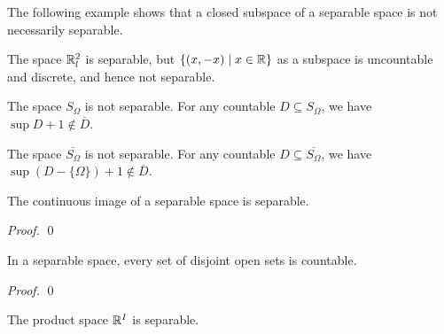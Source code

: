 The following example shows that a closed subspace of a separable space is not
necessarily separable.
\begin{example}[AC]
    The space $\mathbb{R}_l^2$ is separable, but $\{ (x, -x) \mid x \in \mathbb{R} \}$ as a
    subspace is uncountable and discrete, and hence not separable.
\end{example}

\begin{example}
    The space $S_\Omega$ is not separable. For any countable $D \subseteq S_\Omega$,
    we have $\sup D + 1 \notin \overline{D}$.
\end{example}

\begin{example}    
    The space $\overline{S_\Omega}$ is not separable. For any countable $D
    \subseteq \overline{S_\Omega}$, we have $\sup (D - \{ \Omega \}) + 1 \notin
    \overline{D}$.
\end{example}

\begin{proposition}
    The continuous image of a separable space is separable.
\end{proposition}

\begin{proof}
    \pf
    \qed
\end{proof}

\begin{proposition}[Choice]
    In a separable space, every set of disjoint open sets is countable.
\end{proposition}

\begin{proof}
    \pf
    \qed
\end{proof}

\begin{proposition}
    The product space $\mathbb{R}^I$ is separable.
\end{proposition}

